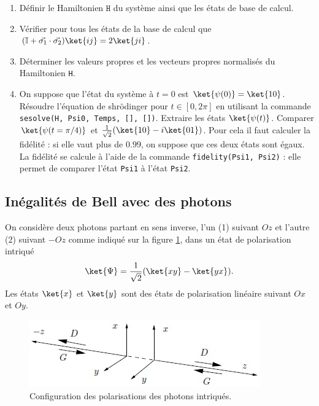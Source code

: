 \begin{enumerate}
\item Définir le Hamiltonien $\mathtt{H}$ du système ainsi que les états de 
base de calcul.

\item Vérifier pour tous les états de la base de calcul que 
$(\mathbb{I}+\vec{\sigma_1}\cdot\vec{\sigma_2})\ket{ij}=2\ket{ji}$.

\item Déterminer les valeurs propres et les vecteurs propres normalisés du 
Hamiltonien \texttt{H}.

\item On suppose que l'état du système à $t=0$ est $\ket{\psi(0)}=\ket{10}$. 
Résoudre l'équation de shr\"odinger pour $t\in[0,2\pi]$ en utilisant la commande 
\texttt{sesolve(H, Psi0, Temps, [], [])}. Extraire les états $\ket{\psi(t)}$. 
Comparer $\ket{\psi(t=\pi/4)}$ et $\frac{1}{\sqrt{2}}(\ket{10}-i\ket{01})$. 
Pour cela il faut calculer la fidélité : si elle vaut plus de 0.99, on suppose 
que ces deux états sont égaux. La fidélité se calcule à l'aide de la commande 
\texttt{fidelity(Psi1, Psi2)} : elle permet de comparer l'état \texttt{Psi1} à 
l'état \texttt{Psi2}.
\end{enumerate}

\subsection{Inégalités de Bell avec des photons}

On considère deux photons partant en sens inverse, l'un (1) suivant $Oz$ et
l'autre (2) suivant $-Oz$ comme indiqué sur la figure
\ref{fig:ExoInegalitesBell}, dans un état de polarisation intriqué%
\begin{equation}
\ket{\Psi}=\frac{1}{\sqrt{2}}(\ket{xy}-\ket{yx}).
\end{equation}
Les états $\ket{x}$ et $\ket{y}$ sont des états de polarisation linéaire suivant
$Ox$ et $Oy$.

\begin{figure}[ptbh]
\centering
	\includegraphics[scale=1]{graphics/ExoInegalitesBell.jpg}
	\caption{Configuration des polarisations des photons intriqués.}
	\label{fig:ExoInegalitesBell}
\end{figure}

